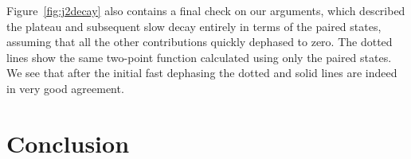 \documentclass [a4paper, 11pt]{article}
\begin{document}
Figure~\ref{fig:j2decay} also contains a final check on our arguments, which described the plateau and subsequent slow decay entirely in terms of the paired states, assuming that all the other contributions quickly dephased to zero. The dotted lines show the same two-point function calculated using only the paired states. We see that after the initial fast dephasing the dotted and solid lines are indeed in very good agreement.

\section{Conclusion}

\end{document}
